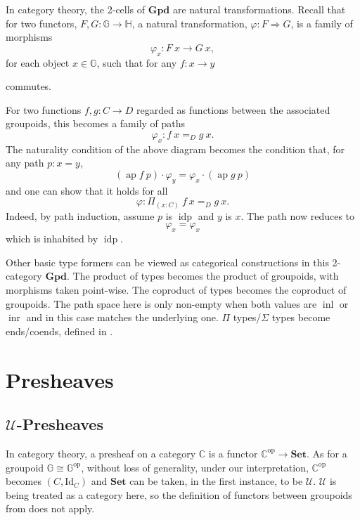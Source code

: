\documentclass[12pt, parskip, DIV=14]{scrbook}
\newcommand{\ap}{\operatorname{ap}}
\newcommand{\idp}{\operatorname{idp}}
\newcommand{\Gpd}{\mathbf{Gpd}}
\newcommand{\inl}{\operatorname{inl}}
\newcommand{\inr}{\operatorname{inr}}
\begin{document}
In category theory, the 2-cells of $\Gpd$ are natural transformations. Recall that for two functors, $F , G : \mathbb{G} \to \mathbb{H}$, a natural transformation, $\varphi : F \Rightarrow G$, is a family of morphisms $$\varphi_x : F~x \to G~x,$$ for each object $x \in \mathbb{G}$, such that for any $f : x \to y$
\begin{center}
\end{center}
commutes.

For two functions $f, g : C \to D$ regarded as functions between the associated groupoids, this becomes a family of paths $$\varphi_x : f~x =_D g~x.$$ The naturality condition of the above diagram becomes the condition that, for any path $p : x = y$,
$$(\ap f~p) \cdot \varphi_y = \varphi_x \cdot (\ap g~p)$$
and one can show that it holds for all
$$\varphi : \Pi_{(x : C)}~f~x =_D g~x.$$ Indeed, by path induction, assume $p$ is $\idp$ and $y$ is $x$. The path now reduces to $$\varphi_x = \varphi_x$$ which is inhabited by $\idp$.

Other basic type formers can be viewed as categorical constructions in this 2-category $\Gpd$. The product of types becomes the product of groupoids, with morphisms taken point-wise. The coproduct of types becomes the coproduct of groupoids. The path space here is only non-empty when both values are $\inl$ or $\inr$ and in this case matches the underlying one. $\Pi$ types/$\Sigma$ types become ends/coends, defined in .

\chapter{Presheaves}

\section{$\mathcal{U}$-Presheaves}

In category theory, a presheaf on a category $\mathbb{C}$ is a functor $\mathbb{C}^{\mathrm{op}} \to \mathbf{Set}$. As for a groupoid $\mathbb{G} \cong \mathbb{G}^{\mathrm{op}}$, without loss of generality, under our interpretation, $\mathbb{C}^{\mathrm{op}}$ becomes $(C , \mathrm{Id}_C)$ and $\mathbf{Set}$ can be taken, in the first instance, to be $\mathcal{U}$. $\mathcal{U}$ is being treated as a category here, so the definition of functors between groupoids from  does not apply.
\end{document}
